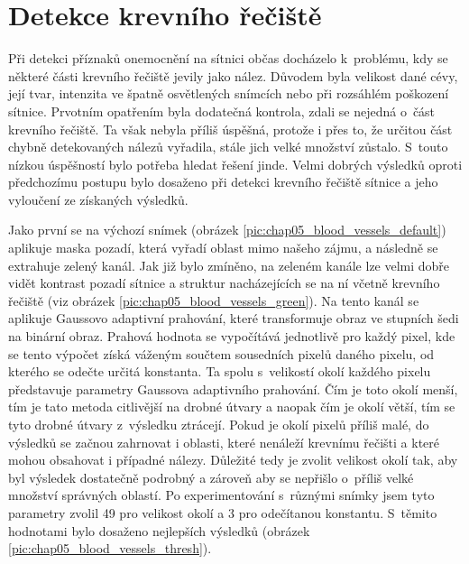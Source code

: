\section{Detekce krevního řečiště}
Při detekci příznaků onemocnění na sítnici občas docházelo k~problému, kdy se některé části krevního řečiště jevily jako nález. Důvodem byla velikost dané cévy, její tvar, intenzita ve špatně osvětlených snímcích nebo při rozsáhlém poškození sítnice. Prvotním opatřením byla dodatečná kontrola, zdali se nejedná o~část krevního řečiště. Ta však nebyla příliš úspěšná, protože i přes to, že určitou část chybně detekovaných nálezů vyřadila, stále jich velké množství zůstalo. S~touto nízkou úspěšností bylo potřeba hledat řešení jinde. Velmi dobrých výsledků oproti předchozímu postupu bylo dosaženo při detekci krevního řečiště sítnice a jeho vyloučení ze získaných výsledků.

Jako první se na výchozí snímek (obrázek \ref{pic:chap05_blood_vessels_default}) aplikuje maska pozadí, která vyřadí oblast mimo našeho zájmu, a následně se extrahuje zelený kanál. Jak již bylo zmíněno, na zeleném kanále lze velmi dobře vidět kontrast pozadí sítnice a struktur nacházejících se na ní včetně krevního řečiště (viz obrázek \ref{pic:chap05_blood_vessels_green}). Na tento kanál se aplikuje Gaussovo adaptivní prahování, které transformuje obraz ve stupních šedi na binární obraz. Prahová hodnota se vypočítává jednotlivě pro každý pixel, kde se tento výpočet získá váženým součtem sousedních pixelů daného pixelu, od kterého se odečte určitá konstanta. Ta spolu s~velikostí okolí každého pixelu představuje parametry Gaussova adaptivního prahování. Čím je toto okolí menší, tím je tato metoda citlivější na drobné útvary a naopak čím je okolí větší, tím se tyto drobné útvary z~výsledku ztrácejí. Pokud je okolí pixelů příliš malé, do výsledků se začnou zahrnovat i oblasti, které nenáleží krevnímu řečišti a které mohou obsahovat i případné nálezy. Důležité tedy je zvolit velikost okolí tak, aby byl výsledek dostatečně podrobný a zároveň aby se nepřišlo o~příliš velké množství správných oblastí. Po experimentování s~různými snímky jsem tyto parametry zvolil 49 pro velikost okolí a 3 pro odečítanou konstantu. S~těmito hodnotami bylo dosaženo nejlepších výsledků (obrázek \ref{pic:chap05_blood_vessels_thresh}).

